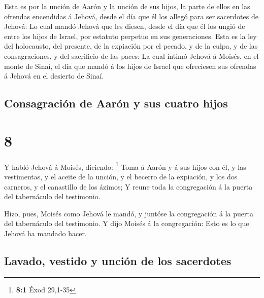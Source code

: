  Esta es por la unción de Aarón y la unción de sus hijos,
la parte de ellos en las ofrendas encendidas á Jehová, desde el día que
él los allegó para ser sacerdotes de Jehová:  Lo cual mandó
Jehová que les diesen, desde el día que él los ungió de entre los hijos
de Israel, por estatuto perpetuo en sus generaciones.  Esta
es la ley del holocausto, del presente, de la expiación por el pecado, y
de la culpa, y de las consagraciones, y del sacrificio de las paces:
 La cual intimó Jehová á Moisés, en el monte de Sinaí, el
día que mandó á los hijos de Israel que ofreciesen sus ofrendas á Jehová
en el desierto de Sinaí.

\hypertarget{consagraciuxf3n-de-aaruxf3n-y-sus-cuatro-hijos}{%
\subsection{Consagración de Aarón y sus cuatro
hijos}\label{consagraciuxf3n-de-aaruxf3n-y-sus-cuatro-hijos}}

\hypertarget{section-7}{%
\section{8}\label{section-7}}

 Y habló Jehová á Moisés, diciendo: \footnote{\textbf{8:1}
  Éxod 29,1-35}  Toma á Aarón y á sus hijos con él, y las
vestimentas, y el aceite de la unción, y el becerro de la expiación, y
los dos carneros, y el canastillo de los ázimos;  Y reune
toda la congregación á la puerta del tabernáculo del testimonio.

 Hizo, pues, Moisés como Jehová le mandó, y juntóse la
congregación á la puerta del tabernáculo del testimonio.  Y
dijo Moisés á la congregación: Esto es lo que Jehová ha mandado hacer.

\hypertarget{lavado-vestido-y-unciuxf3n-de-los-sacerdotes}{%
\subsection{Lavado, vestido y unción de los
sacerdotes}\label{lavado-vestido-y-unciuxf3n-de-los-sacerdotes}}

